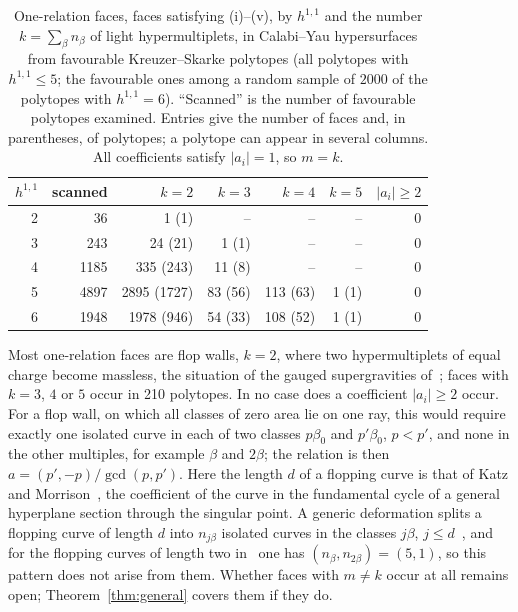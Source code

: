 \begin{table}[t]
\centering\small
\begin{tabular}{rrrrrrr}
\toprule
$h^{1,1}$ & scanned & $k=2$ & $k=3$ & $k=4$ & $k=5$ & $|a_i|\geq2$\\
\midrule
2 & 36 & 1 (1) & -- & -- & -- & 0\\
3 & 243 & 24 (21) & 1 (1) & -- & -- & 0\\
4 & 1185 & 335 (243) & 11 (8) & -- & -- & 0\\
5 & 4897 & 2895 (1727) & 83 (56) & 113 (63) & 1 (1) & 0\\
6 & 1948 & 1978 (946) & 54 (33) & 108 (52) & 1 (1) & 0\\
\bottomrule
\end{tabular}
\caption{One-relation faces, faces satisfying (i)--(v), by $h^{1,1}$ and the number $k=\sum_\beta n_\beta$ of
light hypermultiplets, in Calabi--Yau hypersurfaces from favourable Kreuzer--Skarke polytopes (all
polytopes with $h^{1,1}\leq5$; the favourable ones among a random sample of $2000$ of the polytopes with
$h^{1,1}=6$). ``Scanned'' is
the number of favourable polytopes examined. Entries give the number of faces and, in parentheses, of
polytopes; a polytope can appear in several columns. All coefficients satisfy $|a_i|=1$, so $m=k$.}
\label{tab:census}
\end{table}

Most one-relation faces are flop walls, $k=2$, where two hypermultiplets of equal charge become massless, the
situation of the gauged supergravities of~\cite{Mohaupt:2004de}; faces with $k=3$, $4$ or $5$ occur in
210
 polytopes. In no case does a coefficient $|a_i|\geq2$ occur. For a flop wall, on which all classes
of zero area lie on one ray, this would require exactly one isolated curve in each of two classes
$p\beta_0$ and $p'\beta_0$, $p<p'$, and none in the other multiples, for example $\beta$ and $2\beta$; the
relation is then $a=(p',-p)/\gcd(p,p')$. Here the length $d$ of a flopping curve is that of Katz and Morrison~\cite{KatzMorrison:1992}, the
coefficient of the curve in the fundamental cycle of a general hyperplane section through the singular
point. A generic deformation splits a flopping curve of length $d$ into
$n_{j\beta}$ isolated curves in the classes $j\beta$, $j\leq d$~\cite{Katz:2006contractible}, and for the
flopping curves of length two in~\cite{BrownWemyss:2018} one has $(n_\beta,n_{2\beta})=(5,1)$, so this pattern
does not arise from them. Whether faces with $m\neq k$ occur at all remains open;
Theorem~\ref{thm:general} covers them if they do.


